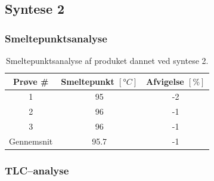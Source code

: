     \subsection{Syntese 2}
    \subsubsection{Smeltepunktsanalyse}
    \begin{table}[H]\centering
        \begin{tabular}{ccc}
                \toprule
                Prøve # & Smeltepunkt $\left[\si{\degree C}\right]$ & Afvigelse $\left[\%\right]$ \\
                \midrule
                1 & 95 & -2 \\
                2 & 96 & -1 \\
                3 & 96 & -1 \\
                \midrule
                Gennemsnit & 95.7 & -1 \\
                \bottomrule
            \end{tabular}
        \caption{Smeltepunktsanalyse af produket dannet ved syntese 2.}
    \end{table}

    \subsubsection{TLC--analyse}
    
    \begin{table}[H]\centering
        \caption{TLC--analyse af propylparaben dannet ved syntese 3.}
    \end{table}

